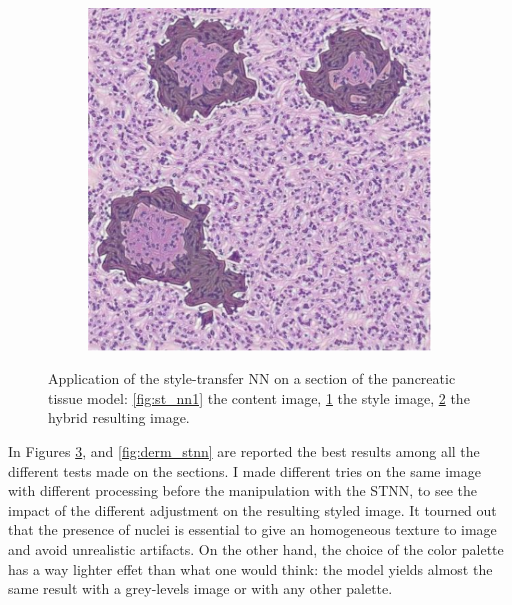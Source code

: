 \begin{description}
\begin{figure}
\begin{subfigure}[t]{0.3\textwidth}
                 \caption{}
                 \label{fig:st_nn2}
            \end{subfigure}
            \quad
            \begin{subfigure}[t]{0.3\textwidth}
                 \centering
                 \includegraphics[width = \textwidth]{images/st_nn3}
                 \caption{}
                 \label{fig:st_nn3}
            \end{subfigure}
            \caption{Application of the style-transfer NN on a section of the pancreatic tissue model: \ref{fig:st_nn1} the content image, \ref{fig:st_nn2} the style image, \ref{fig:st_nn3} the hybrid resulting image.}
            \label{fig:panc_stnn}
        \end{figure}

        In Figures \ref{fig:panc_stnn}, and \ref{fig:derm_stnn} are reported the best results among all the different tests made on the sections. I made different tries on the same image with different processing before the manipulation with the STNN, to see the impact of the different adjustment on the resulting styled image. It tourned out that the presence of nuclei is essential to give an homogeneous texture to image and avoid unrealistic artifacts. On the other hand, the choice of the color palette has a way lighter effet than what one would think: the model yields almost the same result with a grey-levels image or with any other palette.


\end{description}
